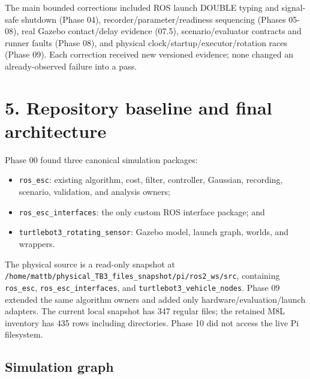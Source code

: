 \documentclass[
  10pt,
  letterpaper,
]{article}
\newcounter{none} %
\providecommand{\tightlist}{%
  \setlength{\itemsep}{0pt}\setlength{\parskip}{0pt}}
\begin{document}
The main bounded corrections included ROS launch DOUBLE typing and signal-safe
shutdown (Phase 04), recorder/parameter/readiness sequencing (Phases 05-08),
real Gazebo contact/delay evidence (07.5), scenario/evaluator contracts and
runner faults (Phase 08), and physical clock/startup/executor/rotation races
(Phase 09). Each correction received new versioned evidence; none changed an
already-observed failure into a pass.

\section{5. Repository baseline and final architecture}\label{repository-baseline-and-final-architecture}

Phase 00 found three canonical simulation packages:

\begin{itemize}
\tightlist
\item
  \nolinkurl{ros\_esc}: existing algorithm, cost, filter, controller, Gaussian,
  recording, scenario, validation, and analysis owners;
\item
  \nolinkurl{ros\_esc\_interfaces}: the only custom ROS interface package; and
\item
  \nolinkurl{turtlebot3\_rotating\_sensor}: Gazebo model, launch graph, worlds, and
  wrappers.
\end{itemize}

The physical source is a read-only snapshot at
\nolinkurl{/home/mattb/physical\_TB3\_files\_snapshot/pi/ros2\_ws/src}, containing
\nolinkurl{ros\_esc}, \nolinkurl{ros\_esc\_interfaces}, and \nolinkurl{turtlebot3\_vehicle\_nodes}. Phase 09
extended the same algorithm owners and added only hardware/evaluation/launch
adapters. The current local snapshot has 347 regular files; the retained M8L
inventory has 435 rows including directories. Phase 10 did not access the live
Pi filesystem.

\subsection{Simulation graph}\label{simulation-graph}
\end{document}
